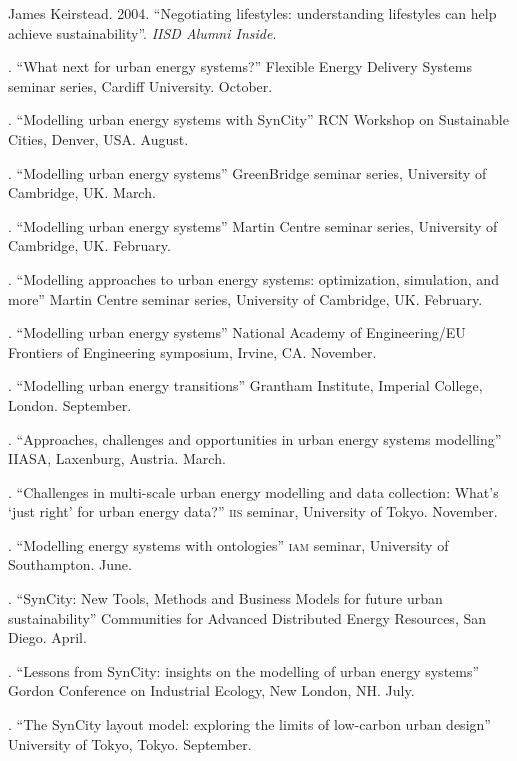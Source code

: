 \documentclass[11pt,a4paper]{article}
\begin{document}
\ind James Keirstead. 2004. ``Negotiating lifestyles: understanding lifestyles can help achieve sustainability''. \emph{IISD Alumni Inside}.

 \bigskip

\noindent{}%
%
. ``What next for urban energy systems?'' Flexible Energy Delivery Systems seminar series, Cardiff University. October.

. ``Modelling urban energy systems with SynCity'' RCN Workshop on Sustainable Cities, Denver, USA.  August.

. ``Modelling urban energy systems'' GreenBridge seminar series, University of Cambridge, UK. March.

. ``Modelling urban energy systems'' Martin Centre seminar series, University of Cambridge, UK. February.

. ``Modelling approaches to urban energy systems: optimization, simulation, and more'' Martin Centre seminar series, University of Cambridge, UK. February.

. ``Modelling urban energy systems'' National Academy of Engineering/EU Frontiers of Engineering symposium, Irvine, CA. November.

. ``Modelling urban energy transitions'' Grantham Institute, Imperial College, London. September.

. ``Approaches, challenges and opportunities in urban energy systems modelling'' IIASA, Laxenburg, Austria. March.

. ``Challenges in multi-scale urban energy modelling and data collection: What's `just right' for urban energy data?'' \textsc{iis} seminar, University of Tokyo. November.

. ``Modelling energy systems with ontologies'' \textsc{iam} seminar, University of Southampton. June.

. ``SynCity: New Tools, Methods and Business Models for future urban sustainability'' Communities for Advanced Distributed Energy Resources, San Diego.  April.

. ``Lessons from SynCity: insights on the modelling of urban energy systems'' Gordon Conference on Industrial Ecology, New London, NH.  July.

. ``The SynCity layout model: exploring the limits of low-carbon urban design'' University of Tokyo, Tokyo.  September.
\end{document}
